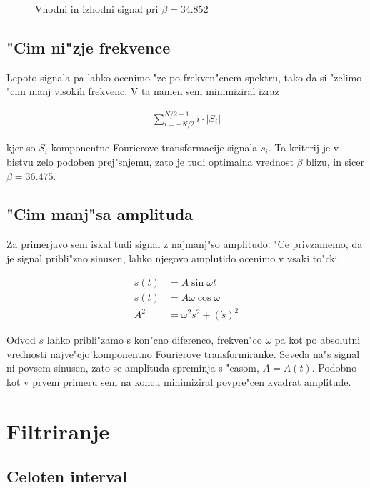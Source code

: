 \documentclass[a4paper,10pt]{article}
\begin{document}
\begin{figure}[h]
 
\caption{Vhodni in izhodni signal pri $\beta = 34.852$}
\label{fig:dekon-signal}
\end{figure}

\subsection{"Cim ni"zje frekvence}

Lepoto signala pa lahko ocenimo "ze po frekven"cnem spektru, tako da si "zelimo "cim manj visokih frekvenc. V ta namen sem minimiziral izraz

\begin{align}
 \sum_{i=-N/2}^{N/2-1} i\cdot|S_i|
\end{align}

kjer so $S_i$ komponentne Fourierove transformacije signala $s_i$. Ta kriterij je v bistvu zelo podoben prej"snjemu, zato je tudi optimalna vrednost $\beta$ blizu, in sicer $\beta = 36.475$. 

\subsection{"Cim manj"sa amplituda}

Za primerjavo sem iskal tudi signal z najmanj"so amplitudo. "Ce privzamemo, da je signal pribli"zno sinusen, lahko njegovo amplutido ocenimo v vsaki to"cki. 

\begin{align}
 s(t) &= A\sin \omega t \\
 \dot s(t) &= A\omega \cos \omega \\ 
 A^2 &= \omega^2 s^2 + (\dot{s})^2
\end{align}

Odvod $\dot s$ lahko pribli"zamo s kon"cno diferenco, frekven"co $\omega$ pa kot po absolutni vrednosti najve"cjo komponentno Fourierove transformiranke. Seveda na"s signal ni povsem sinusen, zato se amplituda spreminja s "casom, $A = A(t)$. Podobno kot v prvem primeru sem na koncu minimiziral povpre"cen kvadrat amplitude. 

\section{Filtriranje}

\subsection{Celoten interval}
\end{document}
